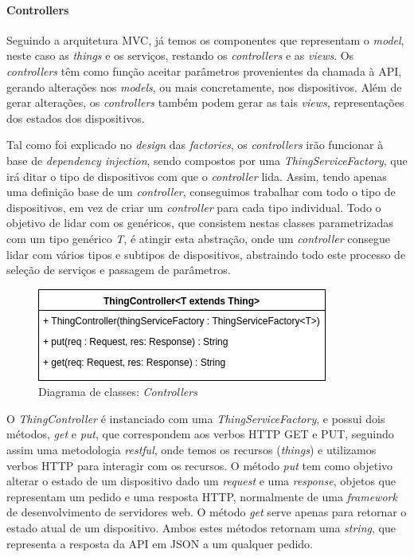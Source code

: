 %
%
%
%

\paragraph*{Controllers}

Seguindo a arquitetura MVC, já temos os componentes que representam o \textit{model}, neste caso as \textit{things} e os serviços, restando os \textit{controllers} e as \textit{views}. Os \textit{controllers} têm como função aceitar parâmetros provenientes da chamada à API, gerando alterações nos \textit{models}, ou mais concretamente, nos dispositivos. Além de gerar alterações, os \textit{controllers} também podem gerar as tais \textit{views}, representações dos estados dos dispositivos.

Tal como foi explicado no \textit{design} das \textit{factories}, os \textit{controllers} irão funcionar à base de \textit{dependency injection}, sendo compostos por uma \textit{ThingServiceFactory}, que irá ditar o tipo de dispositivos com que o \textit{controller} lida. Assim, tendo apenas uma definição base de um \textit{controller}, conseguimos trabalhar com todo o tipo de dispositivos, em vez de criar um \textit{controller} para cada tipo individual. Todo o objetivo de lidar com os genéricos, que consistem nestas classes parametrizadas com um tipo genérico \textit{T}, é atingir esta abstração, onde um \textit{controller} consegue lidar com vários tipos e subtipos de dispositivos, abstraindo todo este processo de seleção de serviços e passagem de parâmetros.

\begin{figure}[H]
  \centering
        \includegraphics[scale=0.75]{img/hub-controllers.png}
  \caption{Diagrama de classes: \textit{Controllers}}
\end{figure}

O \textit{ThingController} é instanciado com uma \textit{ThingServiceFactory}, e possui dois métodos, \textit{get} e \textit{put}, que correspondem aos verbos HTTP GET e PUT, seguindo assim uma metodologia \textit{restful}, onde temos os recursos (\textit{things}) e utilizamos verbos HTTP para interagir com os recursos. O método \textit{put} tem como objetivo alterar o estado de um dispositivo dado um \textit{request} e uma \textit{response}, objetos que representam um pedido e uma resposta HTTP, normalmente de uma \textit{framework} de desenvolvimento de servidores web. O método \textit{get} serve apenas para retornar o estado atual de um dispositivo. Ambos estes métodos retornam uma \textit{string}, que representa a resposta da API em JSON a um qualquer pedido.

